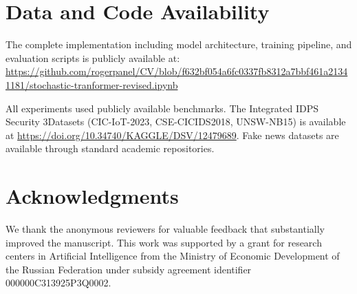 \documentclass[12pt,a4paper]{article}
\theoremstyle{definition}
\begin{document}
\section*{Data and Code Availability}

The complete implementation including model architecture, training pipeline, and evaluation scripts is publicly available at:\\
\url{https://github.com/rogerpanel/CV/blob/f632bf054a6fc0337fb8312a7bbf461a21341181/stochastic-tranformer-revised.ipynb}

All experiments used publicly available benchmarks. The Integrated IDPS Security 3Datasets (CIC-IoT-2023, CSE-CICIDS2018, UNSW-NB15) is available at \url{https://doi.org/10.34740/KAGGLE/DSV/12479689}. Fake news datasets are available through standard academic repositories.

\section*{Acknowledgments}

We thank the anonymous reviewers for valuable feedback that substantially improved the manuscript. This work was supported by a grant for research centers in Artificial Intelligence from the Ministry of Economic Development of the Russian Federation under subsidy agreement identifier 000000C313925P3Q0002.
\end{document}
